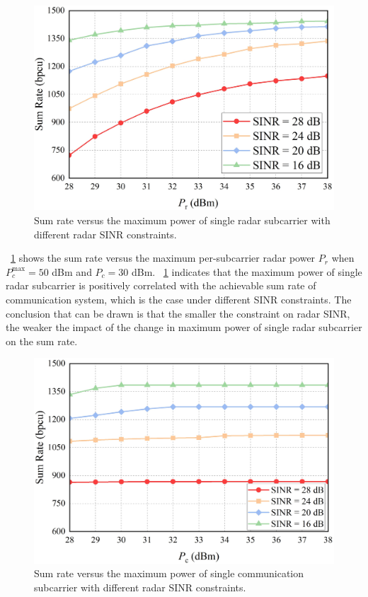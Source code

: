 \documentclass[a4paper,journal,10pt]{IEEEtran}
\begin{document}
\begin{figure}[t]
	\centering
	\includegraphics[width=0.85\columnwidth]{Figure/2.jpg} %
	\caption{Sum rate versus the maximum power of single radar subcarrier with different radar SINR constraints.}
    \vspace{-3mm}
	\label{fig-4}
\end{figure}

\figurename~\ref{fig-4} shows the sum rate versus the maximum per-subcarrier radar power $P_r$ when $P_c^{\max} = 50$ dBm and $P_c = 30$ dBm. \figurename~\ref{fig-4} indicates that the maximum power of single radar subcarrier is positively correlated with the achievable sum rate of communication system, which is the case under different SINR constraints. The conclusion that can be drawn is that the smaller the constraint on radar SINR, the weaker the impact of the change in maximum power of single radar subcarrier on the sum rate. 

\begin{figure}[t]
	\centering
	\includegraphics[width=0.85\columnwidth]{Figure/3.jpg} %
	\caption{Sum rate versus the maximum power of single communication subcarrier with different radar SINR constraints.}
 \vspace{-3mm}
	\label{fig-5}
\end{figure}
\end{document}
